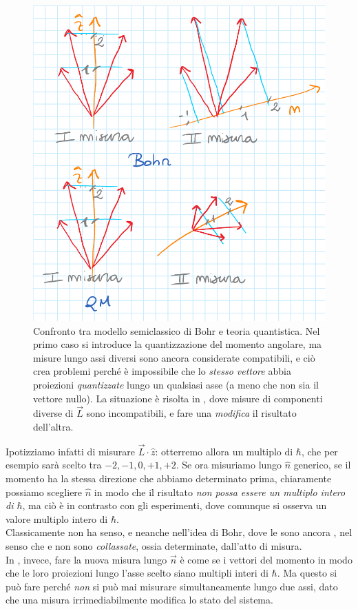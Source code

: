 \documentclass[../../FisicaTeorica.tex]{subfiles}
\begin{document}
\begin{itemize}
\begin{figure}[H]
\includegraphics[scale=0.4]{Immagini/26_11/image001.png}
\caption{Confronto tra modello semiclassico di Bohr e teoria quantistica. Nel primo caso si introduce  la quantizzazione del momento angolare, ma misure lungo assi diversi sono ancora considerate compatibili, e ciò crea problemi perché è impossibile che lo \textit{stesso vettore} abbia proiezioni \textit{quantizzate} lungo un qualsiasi asse (a meno che non sia il vettore nullo). La situazione è risolta in \MQ, dove misure di componenti diverse di $\vec{L}$ sono incompatibili, e fare una \textit{modifica} il risultato dell'altra.}
\end{figure}
Ipotizziamo infatti di misurare $\vec{L}\cdot \hat{z}$: otterremo allora un multiplo di $\hbar$, che per esempio sarà scelto tra $-2,-1,0,+1,+2$. Se ora misuriamo lungo $\hat{n}$ generico, se il momento ha la stessa direzione che abbiamo determinato prima, chiaramente possiamo scegliere $\hat{n}$ in modo che il risultato \textit{non possa essere un multiplo intero di $\hbar$}, ma ciò è in contrasto con gli esperimenti, dove comunque si osserva un valore multiplo intero di $\hbar$.\\
Classicamente non ha senso, e neanche nell'idea di Bohr, dove le  sono ancora , nel senso che  e non sono \textit{collassate}, ossia determinate, dall'atto di misura.\\
In \MQ, invece, fare la nuova misura lungo $\vec{n}$ è come se  i vettori del momento in modo che le loro proiezioni lungo l'asse scelto siano multipli interi di $\hbar$. Ma questo si può fare perché \textit{non} si può mai misurare simultaneamente lungo due assi, dato che una misura irrimediabilmente modifica lo stato del sistema.
\end{itemize}
\end{document}
